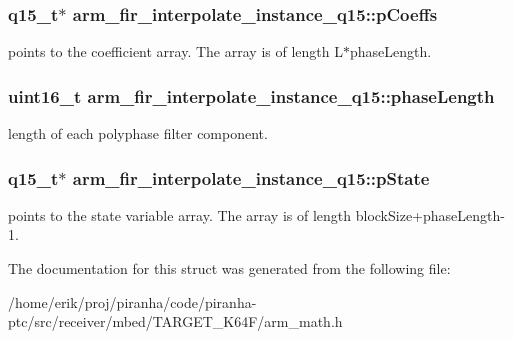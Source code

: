 \subsubsection[{\texorpdfstring{p\+Coeffs}{pCoeffs}}]{\setlength{\rightskip}{0pt plus 5cm}q15\+\_\+t$\ast$ arm\+\_\+fir\+\_\+interpolate\+\_\+instance\+\_\+q15\+::p\+Coeffs}\hypertarget{structarm__fir__interpolate__instance__q15_a767d91d61d4c0beeddd4325d28d28e24}{}\label{structarm__fir__interpolate__instance__q15_a767d91d61d4c0beeddd4325d28d28e24}
points to the coefficient array. The array is of length L$\ast$phase\+Length. 
\subsubsection[{\texorpdfstring{phase\+Length}{phaseLength}}]{\setlength{\rightskip}{0pt plus 5cm}uint16\+\_\+t arm\+\_\+fir\+\_\+interpolate\+\_\+instance\+\_\+q15\+::phase\+Length}\hypertarget{structarm__fir__interpolate__instance__q15_ad5178a02a697a77e0d0e60705d9f0a19}{}\label{structarm__fir__interpolate__instance__q15_ad5178a02a697a77e0d0e60705d9f0a19}
length of each polyphase filter component. 
\subsubsection[{\texorpdfstring{p\+State}{pState}}]{\setlength{\rightskip}{0pt plus 5cm}q15\+\_\+t$\ast$ arm\+\_\+fir\+\_\+interpolate\+\_\+instance\+\_\+q15\+::p\+State}\hypertarget{structarm__fir__interpolate__instance__q15_a26b864363fa47954248f2590e3a82a3c}{}\label{structarm__fir__interpolate__instance__q15_a26b864363fa47954248f2590e3a82a3c}
points to the state variable array. The array is of length block\+Size+phase\+Length-\/1. 

The documentation for this struct was generated from the following file\+:\begin{DoxyCompactItemize}
\item 
/home/erik/proj/piranha/code/piranha-\/ptc/src/receiver/mbed/\+T\+A\+R\+G\+E\+T\+\_\+\+K64\+F/arm\+\_\+math.\+h\end{DoxyCompactItemize}
